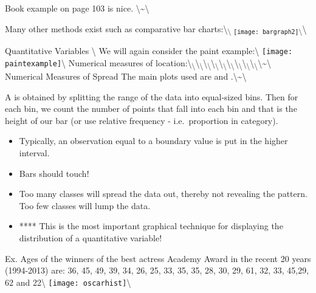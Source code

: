 \documentclass[]{book}
\begin{document}
Book example on page 103 is nice.
\textbackslash{}\textasciitilde{}\textbackslash{}

Many other methods exist such as comparative bar
charts:\textbackslash{}\textsubscript{\textbackslash{}
\texttt{[image: bargraph2]}\textbackslash{}}\textbackslash{}

\newpage

\huge Quantitative Variables \normalsize\textbackslash{} We will again
consider the paint example:\textbackslash{}
\texttt{[image: paintexample]}\textbackslash{} Numerical
measures of
location:\textbackslash{}\textsubscript{\textbackslash{}}\textbackslash{}\textsubscript{\textbackslash{}}\textbackslash{}\textsubscript{\textbackslash{}}\textbackslash{}\textsubscript{\textbackslash{}}\textbackslash{}\textsubscript{\textbackslash{}}\textbackslash{}\textsubscript{\textbackslash{}}\textbackslash{}\textsubscript{\textbackslash{}}\textbackslash{}\textsubscript{\textbackslash{}}\textbackslash{}\textsubscript{\textbackslash{}}\textbackslash{}\textasciitilde{}\textbackslash{}
\newpage
Numerical Measures of Spread \newpage
The main plots used are \underbar{~~~~~~~~~~~~~~~~~~~~~~~~~~~~~~~~~~~~}
and
\underbar{~~~~~~~~~~~~~~~~~~~~~~~~~~~~~~~~~~~~}.\textbackslash{}\textasciitilde{}\textbackslash{}

A \underbar{~~~~~~~~~~~~~~~~~~~~~~~~~~~~~~~~~~~~} is obtained by
splitting the range of the data into equal-sized bins. Then for each
bin, we count the number of points that fall into each bin and that is
the height of our bar (or use relative frequency - i.e.~proportion in
category).\\

\begin{itemize}
\item Typically, an observation equal to a boundary value is put in the higher interval.
\item Bars should touch!
\item Too many classes will spread the data out, thereby not revealing the pattern.  Too few classes will lump the data.  
\item **** This is the most important graphical technique for displaying the distribution of a quantitative variable!
\end{itemize}

Ex. Ages of the winners of the best actress Academy Award in the recent
20 years (1994-2013) are: 36, 45, 49, 39, 34, 26, 25, 33, 35, 35, 28,
30, 29, 61, 32, 33, 45,29, 62 and 22\textbackslash{}
\texttt{[image: oscarhist]}\textbackslash{}
\end{document}
